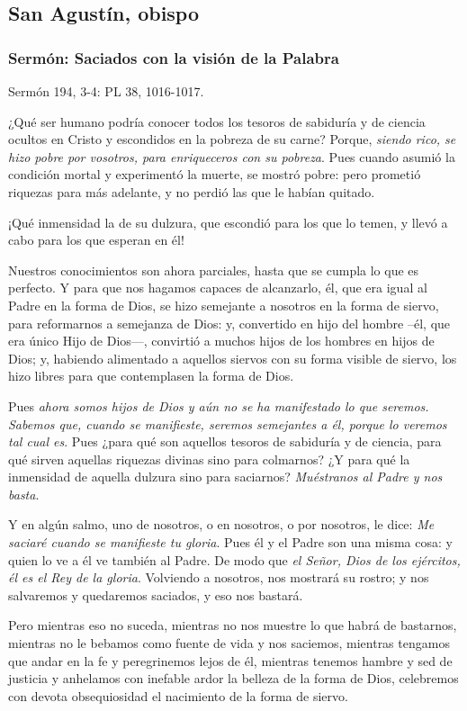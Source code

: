 \begin{body}
\begin{body}
\subsection{San Agustín, obispo}

\subsubsection{Sermón: Saciados con la visión de la Palabra}

Sermón 194, 3-4: PL 38, 1016-1017.

¿Qué ser humano podría conocer todos los tesoros de sabiduría y de ciencia ocultos en Cristo y escondidos en la pobreza de su carne? Porque, \emph{siendo rico, se hizo pobre por vosotros, para enriqueceros con su pobreza}. Pues cuando asumió la condición mortal y experimentó la muerte, se mostró pobre: pero prometió riquezas para más adelante, y no perdió las que le habían quitado.

¡Qué inmensidad la de su dulzura, que escondió para los que lo temen, y llevó a cabo para los que esperan en él!

Nuestros conocimientos son ahora parciales, hasta que se cumpla lo que es perfecto. Y para que nos hagamos capaces de alcanzarlo, él, que era igual al Padre en la forma de Dios, se hizo semejante a nosotros en la forma de siervo, para reformarnos a semejanza de Dios: y, convertido en hijo del hombre --él, que era único Hijo de Dios---, convirtió a muchos hijos de los hombres en hijos de Dios; y, habiendo alimentado a aquellos siervos con su forma visible de siervo, los hizo libres para que contemplasen la forma de Dios.

Pues \emph{ahora somos hijos de Dios y aún no se ha manifestado lo que seremos. Sabemos que, cuando se manifieste, seremos semejantes a él, porque lo veremos tal cual es}. Pues ¿para qué son aquellos tesoros de sabiduría y de ciencia, para qué sirven aquellas riquezas divinas sino para colmarnos? ¿Y para qué la inmensidad de aquella dulzura sino para saciarnos? \emph{Muéstranos al Padre y nos basta}.

Y en algún salmo, uno de nosotros, o en nosotros, o por nosotros, le dice: \emph{Me saciaré cuando se manifieste tu gloria}. Pues él y el Padre son una misma cosa: y quien lo ve a él ve también al Padre. De modo que \emph{el Señor, Dios de los ejércitos, él es el Rey de la gloria}. Volviendo a nosotros, nos mostrará su rostro; y nos salvaremos y quedaremos saciados, y eso nos bastará.

Pero mientras eso no suceda, mientras no nos muestre lo que habrá de bastarnos, mientras no le bebamos como fuente de vida y nos saciemos, mientras tengamos que andar en la fe y peregrinemos lejos de él, mientras tenemos hambre y sed de justicia y anhelamos con inefable ardor la belleza de la forma de Dios, celebremos con devota obsequiosidad el nacimiento de la forma de siervo.


\end{body}
\end{body}
